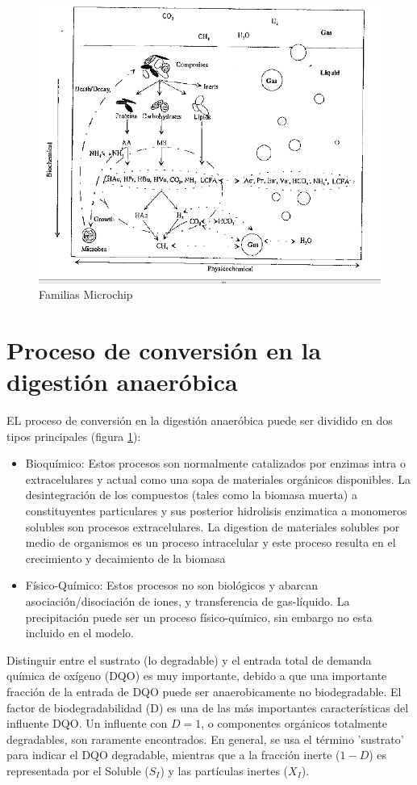 \documentclass[12pt,letterpaper,twoside]{book}
\begin{document}
\begin{figure}
\centering
\includegraphics[width=6in]{Biodigesterprocesses.jpg}
\caption{Familias Microchip}
\label{fig0}
\end{figure}

\section{Proceso de conversión en la digestión anaeróbica}

EL proceso de conversión en la digestión anaeróbica puede ser dividido en dos tipos principales (figura \ref{fig0}):
\begin{itemize}
\item Bioquímico: Estos procesos son normalmente catalizados por enzimas intra o extracelulares y actual como una sopa de materiales orgánicos disponibles. La desintegración de los compuestos (tales como la biomasa muerta) a constituyentes  particulares y sus posterior hidrolisis enzimatica a monomeros solubles son procesos extracelulares. La digestion de materiales solubles por medio de organismos es un proceso intracelular y este proceso resulta en el crecimiento y decaimiento de la biomasa
\item Físico-Químico: Estos procesos no son biológicos y abarcan asociación/disociación de iones, y transferencia de gas-líquido. La precipitación puede ser un proceso físico-químico, sin embargo no esta incluido en el modelo.
\end{itemize}

Distinguir entre el sustrato (lo degradable) y el entrada total de demanda química de oxígeno (DQO) es muy importante, debido a que una importante fracción de la entrada de DQO puede ser anaerobicamente no biodegradable. El factor de biodegradabilidad (D) es una de las más importantes características del influente DQO. Un influente con $D=1$, o componentes orgánicos totalmente degradables, son raramente encontrados. En general, se usa el término 'sustrato' para indicar el DQO degradable, mientras que a la fracción inerte ($1-D$) es representada por el Soluble ($S_I$) y las partículas inertes ($X_I$).  


\backmatter
\end{document}
